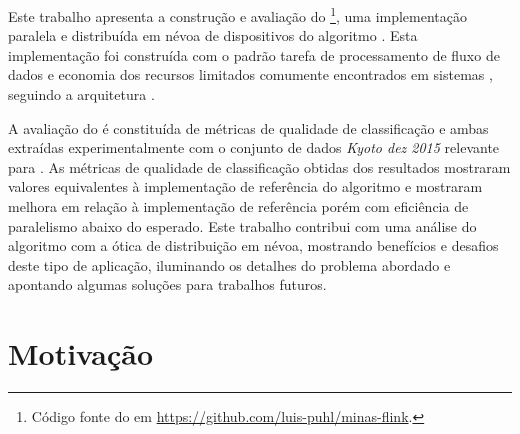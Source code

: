 
Este trabalho apresenta a construção e avaliação do \mfog\footnote{
    Código fonte do \mfog em \url{https://github.com/luis-puhl/minas-flink}.
}, uma implementação
paralela e distribuída em névoa de dispositivos \iot do algoritmo \minas.
Esta implementação foi construída com o padrão \mpi 
{}
tarefa de processamento de fluxo de dados e economia dos recursos limitados
comumente encontrados em sistemas \iot, seguindo a arquitetura \arch
\cite{Cassales2019}.

A avaliação do \mfog é constituída de métricas de qualidade de classificação e
ambas extraídas experimentalmente com o conjunto de dados
\emph{Kyoto dez 2015} relevante para \nids.
% 
% 
As métricas de qualidade de classificação obtidas dos resultados mostraram
valores equivalentes à implementação de referência do algoritmo \minas e
mostraram melhora em relação à implementação de
referência porém com eficiência de paralelismo abaixo do esperado.
Este trabalho contribui com uma análise do algoritmo \minas com a ótica de
distribuição em névoa, mostrando benefícios e desafios deste tipo de aplicação,
iluminando os detalhes do problema abordado e apontando algumas soluções para
trabalhos futuros.

\section{Motivação}\label{sec:motivo}


